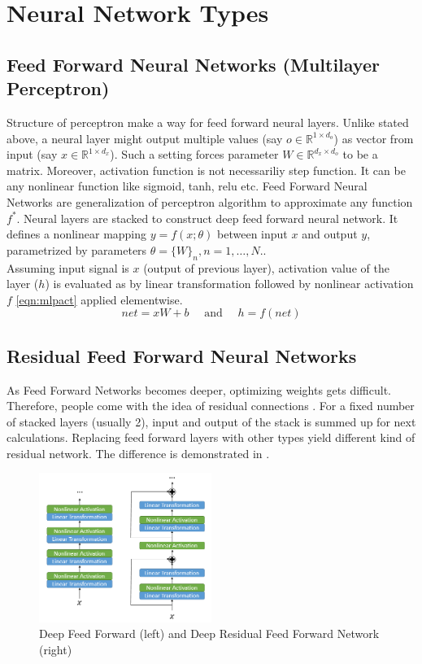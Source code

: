 
\section{Neural Network Types}
\label{sec:nnet_types}
\subsection{Feed Forward Neural Networks (Multilayer Perceptron)}
Structure of perceptron make a way for feed forward neural layers. Unlike stated above, a neural layer might output multiple values (say $o \in \mathbb{R}^{1 \times d_o}$) as vector from input (say $x \in \mathbb{R}^{1 \times d_x}$). Such a setting forces parameter $W \in \mathbb{R}^{d_x \times d_o} $ to be a matrix. Moreover, activation function is not necessariliy step function. It can be any nonlinear function like sigmoid, tanh, relu etc. Feed Forward Neural Networks are generalization of perceptron algorithm to approximate any function $f^*$. Neural layers are stacked to construct deep feed forward neural network. It defines a nonlinear mapping $y=f(x;\theta)$ between input $x$ and output $y$, parametrized by parameters $\theta = \{W\}_n,n=1,…,N.$. \\
Assuming input signal is $x$ (output of previous layer), activation value of the layer ($h$) is evaluated as by linear transformation followed by nonlinear activation $f$ \eqref{eqn:mlpact} applied elementwise. \\
\begin{equation}
\label{eqn:mlpact}
net = x W + b \quad \text{ and }\quad  h = f(net)
\end{equation}
\subsection{Residual Feed Forward Neural Networks}
As Feed Forward Networks becomes deeper, optimizing weights gets difficult. Therefore, people come with the idea of residual connections \cite{he_deep_2015}. For a fixed number of stacked layers (usually 2), input and output of the stack is summed up for next calculations. Replacing feed forward layers with other types yield different kind of residual network. The difference is demonstrated in . \\
\begin{figure}
	\centering
	\includegraphics[width=0.5\textwidth]{figures/ml_theory/rffnn_ffnn.png}
	\caption{Deep Feed Forward (left) and Deep Residual Feed Forward Network (right)}
	\label{fig:rffnn_ffnn}
\end{figure}

